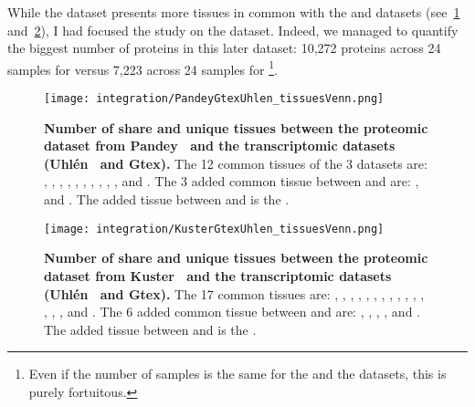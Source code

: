 While the  dataset presents more tissues in common
with the  and  datasets
(see~\cref{fig:VennTissuePandeyGtexUhlen}
and~\cref{fig:VennTissueKusterGtexUhlen}), I had focused the study on
the  dataset. Indeed, we managed to quantify the biggest
number of proteins in this later dataset: 10,272 proteins across 24 samples for
 versus 7,223 across 24 samples for \footnote{Even
if the number of samples is the same for the  and
the  datasets, this is purely fortuitous.}.

\begin{figure}[!htbp]
    \texttt{[image: integration/PandeyGtexUhlen\_tissuesVenn.png]}
    \centering
    \caption[Number of share and unique tissues between the proteomic
    dataset from Pandey \etal\ and the transcriptomic datasets (Uhlén \etal\ and
    Gtex)]{\label{fig:VennTissuePandeyGtexUhlen}\textbf{Number of share and unique
    tissues between the proteomic dataset from Pandey \etal\ and the
    transcriptomic datasets (Uhlén \etal\ and Gtex).} The 12 common tissues of
    the 3 datasets are:
    , , , ,
    , , , , ,
    ,  and . The 3 added common
    tissue between  and  are:
    ,  and . The added tissue
    between  and  is the .}
\end{figure}

\begin{figure}[!htbp]
    \texttt{[image: integration/KusterGtexUhlen\_tissuesVenn.png]}
    \centering
    \caption[Number of share and unique tissues between the proteomic dataset
    from Kuster \etal\ and the transcriptomic datasets (Uhlén \etal\ and
    Gtex)]{\label{fig:VennTissueKusterGtexUhlen}\textbf{Number of share and unique
    tissues between the proteomic dataset from Kuster \etal\ and the
    transcriptomic datasets (Uhlén \etal\ and Gtex).} The 17 common tissues are:
    , , ,  ,
    , , , ,
    , , , ,
    , , ,  and
    . The 6 added common tissue between  and
     are: , ,
    , ,  and .
    The added tissue between  and  is the
    .}
\end{figure}

